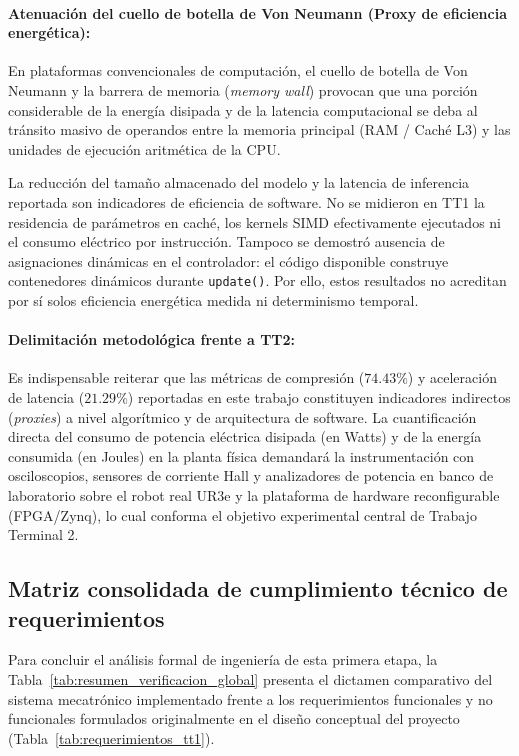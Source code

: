 \documentclass[12pt]{article}
\begin{document}
\paragraph*{Atenuación del cuello de botella de Von Neumann (Proxy de eficiencia energética):}
En plataformas convencionales de computación, el cuello de botella de Von Neumann y la barrera de memoria (\textit{memory wall}) provocan que una porción considerable de la energía disipada y de la latencia computacional se deba al tránsito masivo de operandos entre la memoria principal (RAM / Caché L3) y las unidades de ejecución aritmética de la CPU. 

La reducción del tamaño almacenado del modelo y la latencia de inferencia reportada son indicadores de eficiencia de software. No se midieron en TT1 la residencia de parámetros en caché, los kernels SIMD efectivamente ejecutados ni el consumo eléctrico por instrucción. Tampoco se demostró ausencia de asignaciones dinámicas en el controlador: el código disponible construye contenedores dinámicos durante \texttt{update()}. Por ello, estos resultados no acreditan por sí solos eficiencia energética medida ni determinismo temporal.

\paragraph*{Delimitación metodológica frente a TT2:}
Es indispensable reiterar que las métricas de compresión ($74.43\%$) y aceleración de latencia ($21.29\%$) reportadas en este trabajo constituyen indicadores indirectos (\textit{proxies}) a nivel algorítmico y de arquitectura de software. La cuantificación directa del consumo de potencia eléctrica disipada (en Watts) y de la energía consumida (en Joules) en la planta física demandará la instrumentación con osciloscopios, sensores de corriente Hall y analizadores de potencia en banco de laboratorio sobre el robot real UR3e y la plataforma de hardware reconfigurable (FPGA/Zynq), lo cual conforma el objetivo experimental central de Trabajo Terminal 2.

\subsection{Matriz consolidada de cumplimiento técnico de requerimientos}
\label{sec:matriz_cumplimiento}

Para concluir el análisis formal de ingeniería de esta primera etapa, la Tabla~\ref{tab:resumen_verificacion_global} presenta el dictamen comparativo del sistema mecatrónico implementado frente a los requerimientos funcionales y no funcionales formulados originalmente en el diseño conceptual del proyecto (Tabla~\ref{tab:requerimientos_tt1}).
\end{document}
